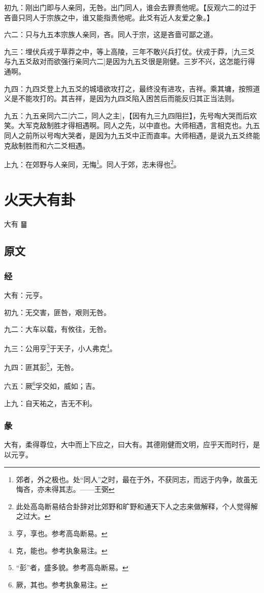 \documentclass[12pt,oneside]{book}
\begin{document}
初九：刚出门即与人亲同，无咎。出门同人，谁会去罪责他呢。【反观六二的过于吝啬只同人于宗族之中，谁又能指责他呢。此爻有近人友爱之象。】

六二：只与九五本宗族人亲同，吝。同人于宗，这是吝啬可鄙之道。

九三：埋伏兵戎于草莽之中，等上高陵，三年不敢兴兵打仗。伏戎于莽，[九三爻与九五爻敌对而欲强行亲同六二]是因为九五爻很是刚健。三岁不兴，这怎能行得通啊。

九四：九四爻登上九五爻的城墙欲攻打之，最终没有进攻，吉祥。乘其墉，按照道义是不能攻打的。其吉祥，是因为九四爻陷入困苦后而能反归其正当法则。

九五：九五亲同六二[六二，同人之主]，【因有九三九四阻拦】，先号啕大哭而后欢笑。大军克敌制胜才得相遇啊。同人之先，以中直也。大师相遇，言相克也。九五同人之前所以号啕大哭者，是因为九五爻中正而直率。大师相遇，是说九五爻终能克敌制胜而和六二爻相遇。

上九：在郊野与人亲同，无悔\footnote{郊者，外之极也。处“同人”之时，最在于外，不获同志，而远于内争，故虽无悔吝，亦未得其志。——王弼}。同人于郊，志未得也\footnote{此处高岛断易结合卦辞对比郊野和旷野和通天下人之志来做解释，个人觉得解之过大。}。


\chapter{火天大有卦}
大有 {\Large ䷍}

\section{原文}

\subsection{经}
大有：元亨。

初九：无交害，匪咎，艰则无咎。

九二：大车以载，有攸往，无咎。

九三：公用亨\footnote{亨，享也。参考高岛断易。}于天子，小人弗克\footnote{克，能也。参考执象易注。}。

九四：匪其彭\footnote{“彭”者，盛多貌。参考高岛断易。}，无咎。

六五：厥\footnote{厥，其也。参考执象易注。}孚交如，威如；吉。

上九：自天祐之，吉无不利。

\subsection{彖}
大有，柔得尊位，大中而上下应之，曰大有。其德刚健而文明，应乎天而时行，是以元亨。
\end{document}
